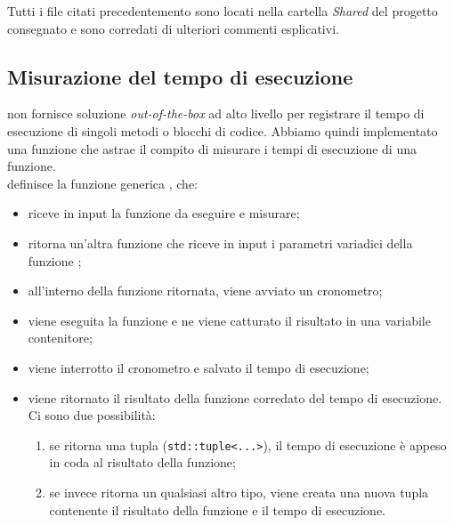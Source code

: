 \noindent Tutti i file citati precedentemento sono locati nella
cartella \textit{Shared} del progetto consegnato e sono corredati di
ulteriori commenti esplicativi.



\subsection{Misurazione del tempo di esecuzione}
\label{sub:stopwatch}

\noindent {} non fornisce soluzione \textit{out-of-the-box} ad alto livello per registrare il tempo di esecuzione di singoli metodi o blocchi di codice. Abbiamo quindi implementato una funzione  che astrae il compito di misurare i tempi di esecuzione di una funzione. \\

\noindent {} definisce la funzione generica , che:

\begin{itemize}
    \item riceve in input la funzione  da eseguire e misurare;
    \item ritorna un'altra funzione che riceve in input i parametri variadici  della funzione ;
    \item all'interno della funzione ritornata, viene avviato un cronometro;
    \item viene eseguita la funzione e ne viene catturato il risultato in una variabile contenitore;
    \item viene interrotto il cronometro e salvato il tempo di esecuzione;
    \item viene ritornato il risultato della funzione corredato del tempo di esecuzione. Ci sono due possibilità:
    \begin{enumerate}
        \item se  ritorna una tupla (\texttt{std::tuple<...>}), il tempo di esecuzione è appeso in coda al risultato della funzione;
        \item se invece  ritorna un qualsiasi altro tipo, viene creata una nuova tupla contenente il risultato della funzione e il tempo di esecuzione.
    \end{enumerate}
\end{itemize}

